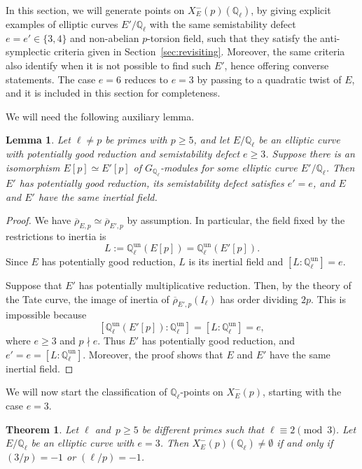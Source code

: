 \documentclass[12pt]{amsart}
\numberwithin{equation}{section}
\newtheorem{lemma}[equation]{Lemma}
\newtheorem{theorem}[equation]{Theorem}
\theoremstyle{definition}
\newcommand{\Q}{\mathbb{Q}}
\newcommand{\rhobar}{{\overline{\rho}}}
\newcommand{\Xp}{X_E^{-}(p)}
\newcommand{\Qun}{\mathbb Q_\ell^{\text{un}}}
\begin{document}
In this section, we will generate points on $\Xp(\Q_\ell)$, by giving explicit examples of elliptic curves $E'/\Q_\ell$ with the same semistability defect $e=e' \in \{3,4\}$ and non-abelian $p$-torsion field, such that they satisfy the anti-symplectic criteria given in Section~\ref{sec:revisiting}. Moreover, the same criteria also identify when it is not possible to find such $E'$, hence offering converse statements. The case $e=6$ reduces to $e=3$ by passing to a quadratic twist of $E$, and it is included in this section for completeness. 

We will need the following auxiliary lemma.

\begin{lemma}\label{lem:same-defect}
Let $\ell\neq p$ be primes with $p\geq 5$, and let
$E/\Q_\ell$ be an elliptic curve with potentially good reduction and
semistability defect $e\geq 3$. Suppose there is an isomorphism
$E[p]\simeq E'[p]$ of $G_{\Q_\ell}$-modules  for some elliptic curve $E'/\Q_\ell$. Then $E'$
has potentially good reduction, its semistability defect satisfies
$e'=e$, and $E$ and $E'$ have the same inertial field.
\end{lemma}
\begin{proof}
We have $\rhobar_{E,p}\simeq \rhobar_{E',p}$ by assumption. 
In particular, the field fixed by the restrictions to inertia is
\[
    L:=\Qun (E[p])
      =\Qun (E'[p]).
\]
Since $E$ has potentially good reduction, $L$ is its inertial field and $[L:\Qun ]=e.$

Suppose that $E'$ has potentially multiplicative reduction. 
Then, by the theory of the Tate curve, the image
of inertia of $\rhobar_{E',p}(I_\ell)$ has order dividing $2p$.
This is impossible because
\[
    [\Qun (E'[p]):\Qun ]
    =[L:\Qun ]=e,
\]
where $e \geq 3$ and $p\nmid e$. 
Thus $E'$ has potentially good reduction, and
$e'=e=[L:\Qun]$. Moreover, the proof shows that $E$ and $E'$ have the same inertial field.
\end{proof}

We will now start the classification of $\Q_\ell$-points on $\Xp$, starting with the case $e=3$.

\begin{theorem}\label{thm:e3l}
	Let $\ell$ and~$p \geq 5$ be different primes such that $\ell \equiv 2 \pmod{3}$.
	Let $E/\Q_\ell$ be an elliptic curve with $e=3$.
	Then $\Xp(\Q_\ell)\neq \emptyset$
	if and only if $(3/p)= -1$ or $(\ell / p) = -1$.
\end{theorem}
\end{document}
